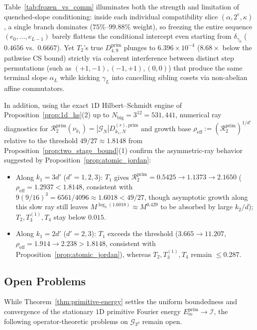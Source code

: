 \documentclass[11pt,a4paper]{article}
\numberwithin{equation}{section}
\theoremstyle{definition}
\theoremstyle{remark}
\newcommand{\cG}{\mathcal{G}}
\newcommand{\cI}{\mathcal{I}}
\newcommand{\prim}{\mathrm{prim}}
\begin{document}
Table~\ref{tab:frozen_vs_comm} illuminates both the strength and limitation of quenched-slope conditioning: inside each individual compatibility slice $(\alpha, 2^e, \kappa)$, a single branch dominates ($75\%\text{--}99.88\%$ weight), so freezing the entire sequence $(e_0, \dots, e_{L-1})$ barely flattens the conditional intercept even starting from $\delta_{\gamma_0}$ ($0.4656$ vs.\ $0.6667$). Yet $T_2$'s true $D_{4,9}^{\prim}$ plunges to $6.396\times 10^{-4}$ ($8.68\times$ below the pathwise CS bound) strictly via coherent interference between distinct step permutations (such as $(+1, -1), (-1, +1), (0, 0)$) that produce the same terminal slope $\alpha_L$ while kicking $\gamma_L$ into cancelling sibling cosets via non-abelian affine commutators.

In addition, using the exact $1$D Hilbert--Schmidt engine of Proposition~\ref{prop:1d_hs}(2) up to $N_{\mathrm{big}} = 3^{12} = 531{,}441$, numerical ray diagnostics for $\mathcal{R}_2^{\prim}(\nu_{k_1}) = |\cG_N| D_{k_1, N}^{(r), \prim}$ and growth base $\rho_{\mathrm{eff}} := (\mathcal{R}_2^{\prim})^{1/d'}$ relative to the threshold $49/27 \approx 1.8148$ from Proposition~\ref{prop:two_stage_bound}(1) confirm the asymmetric-ray behavior suggested by Proposition~\ref{prop:atomic_jordan}:
\begin{itemize}[leftmargin=2em]
\item Along $k_1 = 3 d'$ ($d' = 1, 2, 3$): $T_1$ gives $\mathcal{R}_2^{\prim} = 0.5425 \to 1.1373 \to 2.1650$ ($\rho_{\mathrm{eff}} = 1.2937 < 1.8148$, consistent with $9(9/16)^3 = 6561/4096 \approx 1.6018 < 49/27$, though asymptotic growth along this slow ray still leaves $M^{\log_3(1.6018)} \approx M^{0.429}$ to be absorbed by large $k_2/d$); $T_2, T_3^{(1)}, T_4$ stay below $0.015$.
\item Along $k_1 = 2 d'$ ($d' = 2, 3$): $T_1$ exceeds the threshold ($3.665 \to 11.207$, $\rho_{\mathrm{eff}} = 1.914 \to 2.238 > 1.8148$, consistent with Proposition~\ref{prop:atomic_jordan}), whereas $T_2, T_3^{(1)}, T_4$ remain $\le 0.287$.
\end{itemize}

\subsection{Open Problems}\label{subsec:open_problems}

While Theorem~\ref{thm:primitive-energy} settles the uniform boundedness and convergence of the stationary $1$D primitive Fourier energy $E_m^{\prim} \to \cI$, the following operator-theoretic problems on $\cG_{3^d}$ remain open.
\end{document}
